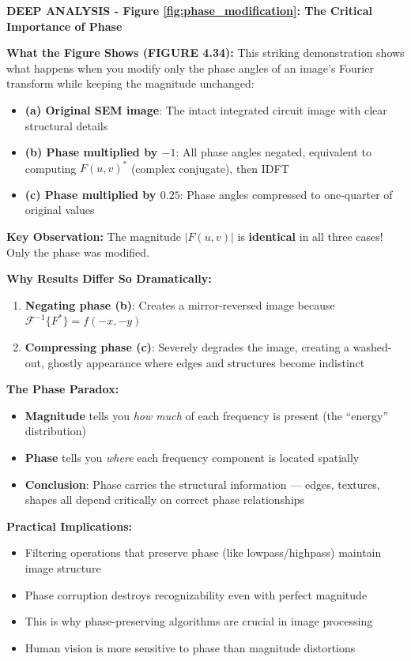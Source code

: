 \documentclass[12pt,a4paper]{article}
\begin{document}
\begin{deepexplanation}
\textbf{DEEP ANALYSIS - Figure \ref{fig:phase_modification}: The Critical Importance of Phase}

\textbf{What the Figure Shows (FIGURE 4.34):}
This striking demonstration shows what happens when you modify only the phase angles of an image's Fourier transform while keeping the magnitude unchanged:
\begin{itemize}
    \item \textbf{(a) Original SEM image}: The intact integrated circuit image with clear structural details
    \item \textbf{(b) Phase multiplied by $-1$}: All phase angles negated, equivalent to computing $F(u,v)^*$ (complex conjugate), then IDFT
    \item \textbf{(c) Phase multiplied by $0.25$}: Phase angles compressed to one-quarter of original values
\end{itemize}

\textbf{Key Observation:}
The magnitude $|F(u,v)|$ is \textbf{identical} in all three cases! Only the phase was modified.

\textbf{Why Results Differ So Dramatically:}
\begin{enumerate}
    \item \textbf{Negating phase (b)}: Creates a mirror-reversed image because $\mathcal{F}^{-1}\{F^*\} = f(-x, -y)$
    \item \textbf{Compressing phase (c)}: Severely degrades the image, creating a washed-out, ghostly appearance where edges and structures become indistinct
\end{enumerate}

\textbf{The Phase Paradox:}
\begin{itemize}
    \item \textbf{Magnitude} tells you \textit{how much} of each frequency is present (the ``energy'' distribution)
    \item \textbf{Phase} tells you \textit{where} each frequency component is located spatially
    \item \textbf{Conclusion}: Phase carries the structural information --- edges, textures, shapes all depend critically on correct phase relationships
\end{itemize}

\textbf{Practical Implications:}
\begin{itemize}
    \item Filtering operations that preserve phase (like lowpass/highpass) maintain image structure
    \item Phase corruption destroys recognizability even with perfect magnitude
    \item This is why phase-preserving algorithms are crucial in image processing
    \item Human vision is more sensitive to phase than magnitude distortions
\end{itemize}
\end{deepexplanation}
\end{document}

